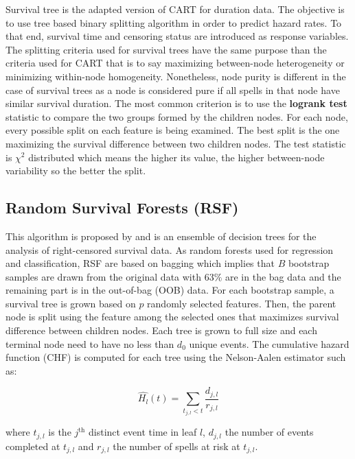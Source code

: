 \documentclass[
]{book}
\begin{document}
Survival tree \citep{SURV_TREE} is the adapted version of CART for duration data. The objective is to use tree based binary splitting algorithm in order to predict hazard rates. To that end, survival time and censoring status are introduced as response variables. The splitting criteria used for survival trees have the same purpose than the criteria used for CART that is to say maximizing between-node heterogeneity or minimizing within-node homogeneity. Nonetheless, node purity is different in the case of survival trees as a node is considered pure if all spells in that node have similar survival duration. The most common criterion is to use the \textbf{logrank test} statistic to compare the two groups formed by the children nodes. For each node, every possible split on each feature is being examined. The best split is the one maximizing the survival difference
between two children nodes. The test statistic is \(\chi^2\) distributed which means the higher its value, the higher between-node variability so the better the split.

\hypertarget{random-survival-forests-rsf}{%
\subsection{Random Survival Forests (RSF)}\label{random-survival-forests-rsf}}

This algorithm is proposed by \citet{RSF} and is an ensemble of decision trees for the analysis of right-censored survival data. As random forests used for regression and classification, RSF are based on bagging which implies that \(B\) bootstrap samples are drawn from the original data with 63\(\%\) are in the bag data and the remaining part is in the out-of-bag (OOB) data. For each bootstrap sample, a survival tree is grown based on \(p\) randomly selected features. Then, the parent node is split using the feature among the selected ones that maximizes survival difference between children nodes. Each tree is grown to full size and each terminal node need to have no less than \(d_0\) unique events. The cumulative hazard function (CHF) is computed for each tree using the Nelson-Aalen estimator such as:

\begin{equation}
  \widehat{H_l}(t) = \sum_{t_{j, l} < t} \frac{d_{j,l}}{r_{j,l}}
  \label{eq:chf}
\end{equation}

where \(t_{j,l}\) is the \(j^{\text{th}}\) distinct event time in leaf \(l\), \(d_{j,l}\) the number of events completed at \(t_{j,l}\) and \(r_{j,l}\) the number of spells at risk at \(t_{j,l}\).
\end{document}
